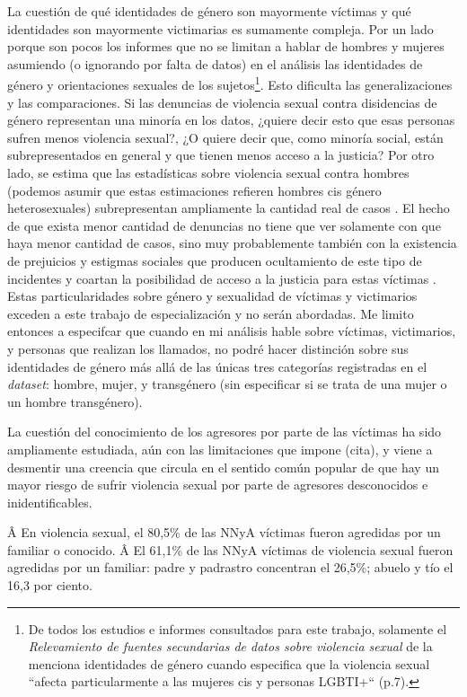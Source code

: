 \documentclass[10 pt]{article}
\begin{document}
La cuestión de qué identidades de género son mayormente víctimas y qué identidades son mayormente victimarias es sumamente compleja. Por un lado porque son pocos los informes que no se limitan a hablar de hombres y mujeres asumiendo (o ignorando por falta de datos) en el análisis las identidades de género y orientaciones sexuales de los sujetos\footnote{De todos los estudios e informes consultados para este trabajo, solamente el \textit{Relevamiento de fuentes secundarias de datos sobre violencia sexual} de la \citet{ufem_relevamiento} menciona identidades de género cuando especifica que la violencia sexual “afecta particularmente a las mujeres cis y personas LGBTI+“ (p.7).}. Esto dificulta las generalizaciones y las comparaciones. Si las denuncias de violencia sexual contra disidencias de género representan una minoría en los datos, ¿quiere decir esto que esas personas sufren menos violencia sexual?, ¿O quiere decir que, como minoría social, están subrepresentados en general y que tienen menos acceso a la justicia? Por otro lado, se estima que las estadísticas sobre violencia sexual contra hombres (podemos asumir que estas estimaciones refieren hombres cis género heterosexuales) subrepresentan ampliamente la cantidad real de casos \citep*[p.~149]{ferris2002world}. El hecho de que exista menor cantidad de denuncias no tiene que ver solamente con que haya menor cantidad de casos, sino muy probablemente también con la existencia de prejuicios y estigmas sociales que producen ocultamiento de este tipo de incidentes y coartan la posibilidad de acceso a la justicia para estas víctimas \citep*[p.~149]{ferris2002world}. Estas particularidades sobre género y sexualidad de víctimas y victimarios exceden a este trabajo de especialización y no serán abordadas. Me limito entonces a especifcar que cuando en mi análisis hable sobre víctimas, victimarios, y personas que realizan los llamados, no podré hacer distinción sobre sus identidades de género más allá de las únicas tres categorías registradas en el \textit{dataset}: hombre, mujer, y transgénero (sin especificar si se trata de una mujer o un hombre transgénero).  

La cuestión del conocimiento de los agresores por parte de las víctimas ha sido ampliamente estudiada, aún con las limitaciones que impone (cita), y viene a desmentir una creencia que circula en el sentido común popular de que hay un mayor riesgo de sufrir violencia sexual por parte de agresores desconocidos e inidentificables.  

Â En violencia sexual, el 80,5\% de las NNyA víctimas fueron agredidas por un familiar o conocido.
Â El 61,1\% de las NNyA víctimas de violencia sexual fueron agredidas por un familiar: padre y padrastro concentran el 26,5\%; abuelo y tío el 16,3 por ciento.
\end{document}
